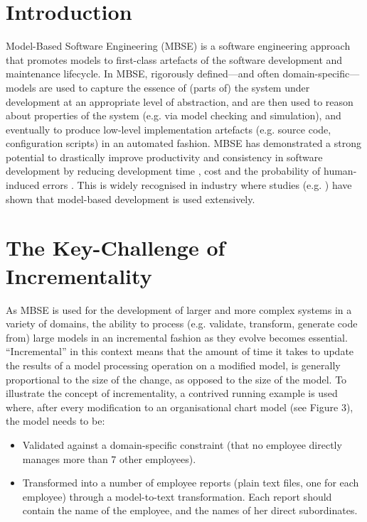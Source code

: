 \documentclass{llncs}
\begin{document}
\section{Introduction}
Model-Based Software Engineering (MBSE) is a software engineering approach that promotes models to first-class artefacts of the software development and maintenance lifecycle. In MBSE, rigorously defined---and often domain-specific---models are used to capture the essence of (parts of) the system under development at an appropriate level of abstraction, and are then used to reason about properties of the system (e.g. via model checking and simulation), and eventually to produce low-level implementation artefacts (e.g. source code, configuration scripts) in an automated fashion. MBSE has demonstrated a strong potential to drastically improve productivity and consistency in software development by reducing development time \cite{jaaksi2002developing}, cost \cite{davies2014model} and the probability of human-induced errors \cite{mohagheghi2013empirical}. This is widely recognised in industry where studies (e.g. \cite{liebel2014assessing, hutchinson2011empirical}) have shown that model-based development is used extensively.

\section{The Key-Challenge of Incrementality}
As MBSE is used for the development of larger and more complex systems in a variety of domains, the ability to process (e.g. validate, transform, generate code from) large models in an incremental fashion as they evolve becomes essential. ``Incremental'' in this context means that the amount of time it takes to update the results of a model processing operation on a modified model, is generally proportional to the size of the change, as opposed to the size of the model. To illustrate the concept of incrementality, a contrived running example is used where, after every modification to an organisational chart model (see Figure 3), the model needs to be:

\begin{itemize}
\item Validated against a domain-specific constraint (that no employee directly manages more than
7 other employees).
\item Transformed into a number of employee reports (plain text files, one for each employee) through
a model-to-text transformation. Each report should contain the name of the employee, and the names of her direct subordinates.
\end{itemize}
\end{document}
